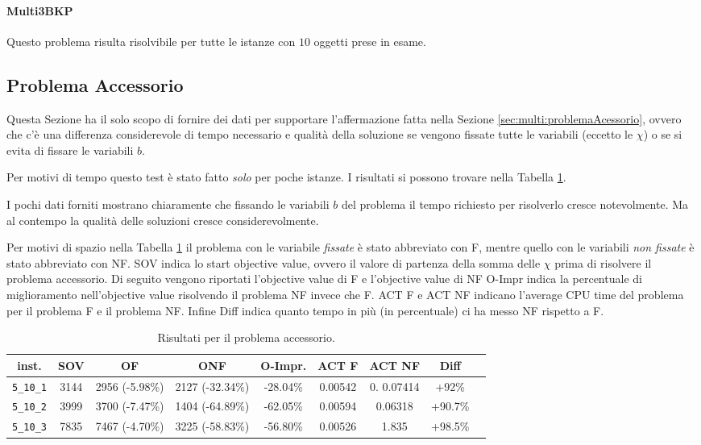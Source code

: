 \paragraph{Multi3BKP}
Questo problema risulta risolvibile per tutte le istanze con $10$ oggetti prese
in esame. 







\subsection{Problema Accessorio}
\label{sec:benchmark:accessorio}
Questa Sezione ha il solo scopo di fornire dei dati per supportare l'affermazione
fatta nella Sezione \ref{sec:multi:problemaAcessorio}, ovvero che c'è una 
differenza  considerevole di tempo necessario e qualità della soluzione se 
vengono fissate 
tutte le variabili (eccetto le $\chi$) o se si evita di fissare le variabili
$b$.

Per motivi di tempo questo test è stato fatto \emph{solo} per poche istanze.
I risultati si possono trovare nella Tabella \ref{table:accessorio:res}.

I pochi dati forniti mostrano chiaramente che fissando le variabili $b$ del problema
il tempo richiesto per risolverlo cresce notevolmente. Ma al contempo la qualità
delle soluzioni cresce considerevolmente.

Per motivi di spazio nella Tabella \ref{table:accessorio:res} il problema con
le variabile \emph{fissate} è stato abbreviato con F, mentre quello con le
variabili \emph{non fissate} è stato abbreviato con NF.
SOV indica lo start objective
value, ovvero il valore di partenza della somma delle $\chi$ prima di risolvere
il problema accessorio.
Di seguito vengono riportati l'objective value di F e l'objective value di NF 
O-Impr indica la percentuale di miglioramento nell'objective value risolvendo
il problema NF invece che F. 
ACT F e ACT NF indicano l'average CPU time del problema per il problema F
e il problema NF. Infine Diff indica quanto tempo
in più (in percentuale) ci ha messo NF rispetto a F.


\begin{table}[h!]
\begin{center}
\small
\begin{tabular}{| c | c | c | c | c | c | c | c | c | }
\hline
inst.			& SOV	& OF				& ONF 				& O-Impr. 	& ACT F 	& ACT NF 		& Diff \\
\hline
\verb|5_10_1|	& 3144  	& 2956	(-5.98\%) 	& 2127 	(-32.34\%)	& -28.04\%	 			& 0.00542 	&  0. 0.07414 	& +92\% \\ 
\verb|5_10_2|	& 3999		& 3700	(-7.47\%)	& 1404	(-64.89\%)	& -62.05\%				& 0.00594	& 0.06318 		& +90.7\%\\
\verb|5_10_3|	& 7835		& 7467	(-4.70\%)	& 3225	(-58.83\%)	& -56.80\%				& 0.00526	& 1.835 		& +98.5\% \\

\hline
\end{tabular}
\caption{Risultati per il problema accessorio.}
\label{table:accessorio:res}
\end{center}
\end{table}
